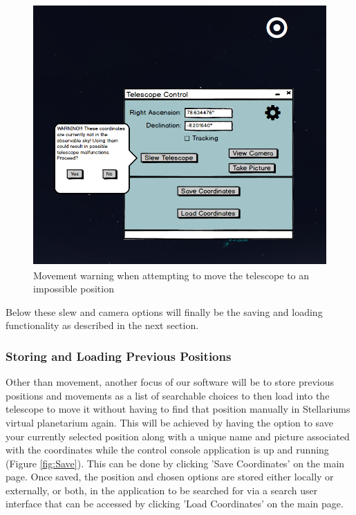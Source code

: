 \documentclass[12pt]{article}
\begin{document}
\begin{figure}[h]
	\centering
	\includegraphics[width=0.80\linewidth, height=10cm]{MainScreenSlewWarning}
	\caption{Movement warning when attempting to move the telescope to an impossible position}
	\label{fig:MainScreenSlewWarning}
\end{figure}

Below these slew and camera options will finally be the saving and loading functionality as described in the next section.



\subsubsection{Storing and Loading Previous Positions}

Other than movement, another focus of our software will be to store previous positions and movements as a list of searchable choices to then load into the telescope to move it without having to find that position manually in Stellariums virtual planetarium again. This will be achieved by having the option to save your currently selected position along with a unique name and picture associated with the coordinates while the control console application is up and running (Figure \ref{fig:Save}). This can be done by clicking 'Save Coordinates' on the main page. Once saved, the position and chosen options are stored either locally or externally, or both, in the application to be searched for via a search user interface that can be accessed by clicking 'Load Coordinates' on the main page.

\newpage
\end{document}
